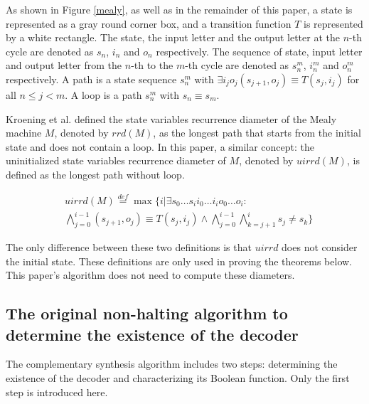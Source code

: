 \documentclass[journal]{IEEEtran}
\begin{document}
As shown in Figure \ref{mealy},
as well as in the remainder of this paper,
a state is represented as a gray round corner box,
and a transition function $T$ is represented by a white rectangle.
The state, the input letter and the output letter at the $n$-th cycle are denoted as $s_n$, $i_n$ and $o_n$ respectively.
The sequence of state, input letter and output letter from the $n$-th to the $m$-th cycle are denoted as $s_n^m$, $i_n^m$ and $o_n^m$ respectively.
A path is a state sequence $s_n^{m}$ with $\exists i_jo_j (s_{j+1},o_j)\equiv T(s_j,i_j)$ for all $n\le j< m$.
A loop is a path $s_n^{m}$ with $s_n\equiv s_m$.


Kroening et al. \cite{RecDiam} defined the state variables recurrence diameter of the Mealy machine $M$,
denoted by $rrd(M)$,
as the longest path that starts from the initial state and does not contain a loop.
In this paper,
a similar concept: the uninitialized state variables recurrence diameter of $M$,
denoted by $uirrd(M)$,
is defined as the longest path without loop.

\begin{equation}\label{equ_uisvrd}
\begin{split}
&uirrd(M)\overset{def}{=}\max\{i|\exists s_0 \dots s_i i_0 \dots i_i o_0 \dots o_i:\\
&\bigwedge^{i-1}_{j=0}(s_{j+1},o_j)\equiv T(s_j,i_j)\wedge\bigwedge^{i-1}_{j=0}\bigwedge^{i}_{k=j+1}s_{j}\ne s_{k}\}
\end{split}
\end{equation}

The only difference between these two definitions is that $uirrd$ does not consider the initial state.
These definitions are only used in proving the theorems below.
This paper's algorithm does not need to compute these diameters.

\subsection{The original non-halting algorithm to determine the existence of the decoder}\label{subsec_chkextdec}
The complementary synthesis algorithm\cite{ShengYuShen:iccad09} includes two steps:
determining the existence of the decoder and characterizing its Boolean function.
Only the first step is introduced here.
\end{document}
